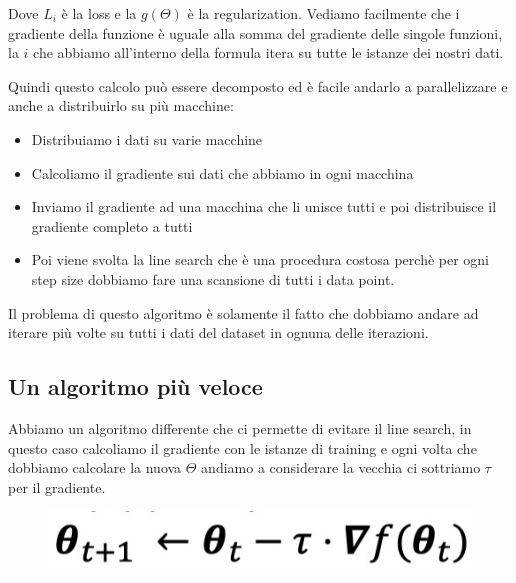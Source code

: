 \documentclass[14pt]{extreport}
\begin{document}
Dove $L_i$ è la loss e la $g(\Theta)$ è la regularization. Vediamo facilmente che i gradiente della funzione è uguale alla somma del gradiente delle
singole funzioni, la $i$ che abbiamo all'interno della formula itera su tutte le istanze dei nostri dati.

Quindi questo calcolo può essere decomposto ed è facile andarlo a parallelizzare e anche a distribuirlo su più macchine:

\begin{itemize}
	\item Distribuiamo i dati su varie macchine
	\item Calcoliamo il gradiente sui dati che abbiamo in ogni macchina
	\item Inviamo il gradiente ad una macchina che li unisce tutti e poi distribuisce il gradiente completo a tutti
	\item Poi viene svolta la line search che è una procedura costosa perchè per ogni step size dobbiamo fare una scansione di tutti i data point.
\end{itemize}

Il problema di questo algoritmo è solamente il fatto che dobbiamo andare ad iterare più volte su tutti i dati del dataset in ognuna delle iterazioni.

\subsection{Un algoritmo più veloce}

Abbiamo un algoritmo differente che ci permette di evitare il line search, in questo caso calcoliamo il gradiente con le istanze di training e ogni
volta che dobbiamo calcolare la nuova $\Theta$ andiamo a considerare la vecchia ci sottriamo $\tau$ per il gradiente.

\begin{figure}[H]
	\centering
	\includegraphics[width=0.7\linewidth]{246.jpeg}
\end{figure}
\end{document}
